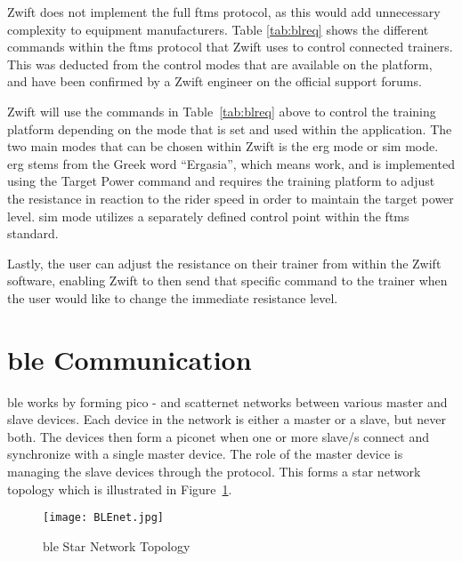 \vspace*{-0.5cm}

Zwift does not implement the full \ac{ftms} protocol, as this would add unnecessary complexity to equipment manufacturers. Table \ref{tab:blreq} shows the different commands within the \ac{ftms} protocol that Zwift uses to control connected trainers. This was deducted from the control modes that are available on the platform, and have been confirmed by a Zwift engineer on the official support forums. \citep[2021]{Jeremy:2021}

Zwift will use the commands in Table~\ref{tab:blreq} above to control the training platform depending on the mode that is set and used within the application. The two main modes that can be chosen within Zwift is the \acf{erg} mode or \acf{sim} mode. \ac{erg} stems from the Greek word ``Ergasia'', which means work, and is implemented using the Target Power command and requires the training platform to adjust the resistance in reaction to the rider speed in order to maintain the target power level. \ac{sim} mode utilizes a separately defined control point within the \ac{ftms} standard.  \citep{Zwiftinsider:2022}

Lastly, the user can adjust the resistance on their trainer from within the Zwift software, enabling Zwift to then send that specific command to the trainer when the user would like to change the immediate resistance level.

\section{\acf{ble} Communication}
\label{sec:ble}

\ac{ble} works by forming pico - and scatternet networks between various master and slave devices. Each device in the network is either a master or a slave, but never both. The devices then form a piconet when one or more slave/s connect and synchronize with a single master device. The role of the master device is managing the slave devices through the protocol. This forms a star network topology which is illustrated in Figure~\ref{fig:ble}. \citep{Townsend:2014}

\begin{figure}[H]
	\begin{center}
		\texttt{[image: BLEnet.jpg]}
		\caption{\ac{ble} Star Network Topology}
		\label{fig:ble}
	\end{center}
\end{figure}

